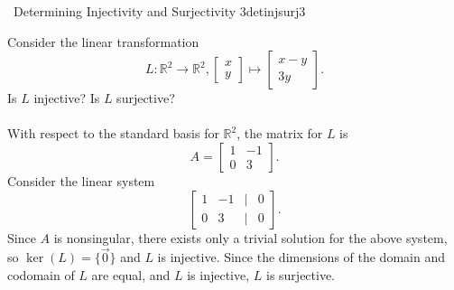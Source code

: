         \begin{example}{\Difficulty\,\Difficulty\,\,Determining Injectivity and Surjectivity 3}{detinjsurj3}

            Consider the linear transformation
            \begin{equation*}
                L:\mathbb{R}^2\to\mathbb{R}^2,\begin{bmatrix} x \\ y \end{bmatrix}\mapsto \begin{bmatrix} x-y \\ 3y \end{bmatrix}.
            \end{equation*}
            Is \(L\) injective? Is \(L\) surjective?
            \\
            \\
            With respect to the standard basis for \(\mathbb{R}^2\), the matrix for \(L\) is
            \begin{equation*}
                A=\begin{bmatrix}
                    1 & -1 \\
                    0 & 3
                \end{bmatrix}.
            \end{equation*}
            Consider the linear system
            \begin{equation*}
                \begin{bmatrix}
                    1 & -1 & | & 0 \\
                    0 & 3 & | & 0
                \end{bmatrix}.
            \end{equation*}
            Since \(A\) is nonsingular, there exists only a trivial solution for the above system, so \(\ker(L)=\{\vec{0}\}\) and \(L\) is injective. Since the dimensions of the domain and codomain of \(L\) are equal, and \(L\) is injective, \(L\) is surjective.
            
        \end{example}
